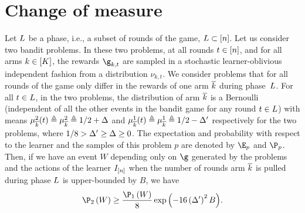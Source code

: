 %
\section{Change of measure}
\label{app:changeMeasureLem}
%
\begin{lemma}[\textcolor{titleTh}{Change of measure}]\label{l:changeMeas}
	Let $L$ be a phase, i.e., a subset of rounds of 
	the game, $L\subset [n]$. Let us 
	consider two  bandit problems. In these two problems, at all rounds $t\in[n]$, and for all arms $k\in[K]$, the rewards $\gainVector_{k,t}$ are sampled in a stochastic learner-oblivious independent fashion from a distribution $\nu_{k,t}$.
	We consider problems that for all rounds of the game only differ in the rewards of one arm $\overline k$ 
	during phase~$L$. For all $t\in L$, 
	in the two problems, the distribution of  arm $\overline k$ is a Bernoulli 
	(independent  of all the other events in the bandit game for any round $t\in L$) with 
	means $\mu^2_{\overline k}(t)\triangleq\mu^2_{\overline k}\triangleq 1/2+\Delta$ 
	and $\mu^1_{\overline k}(t)\triangleq\mu^1_{\overline k}\triangleq1/2-\Delta'$ respectively for the two problems, 
	where $1/8>\Delta'\geq \Delta \geq 0$. 
		The expectation and probability with respect to the
	learner and the samples of this problem $p$ are denoted by
	$\Exp_{p}$ and $\Pro_{p}$.
	Then, if we have an event $W$
	depending only on $\gainVector$ generated by the problems and the actions of the learner $I_{[n]}$
	when the number of rounds  arm $\overline k$ is 
	pulled during phase $L$ is upper-bounded by $B$, we have  %
	\[
	\Pro_{2}\left(W \right)
	\geq
	\frac{\Pro_{1}\left(W  \right)}{8}
	\exp\left(-16\left(\gap'\right)^2B\right)\!.
	\]
\end{lemma}
%
